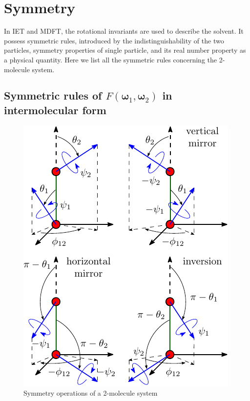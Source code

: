 \section{Symmetry\label{sec:Symmetry-rot_invar}}

In \acs{IET} and \acs{MDFT}, the rotational invariants are used
to describe the solvent. It possess symmetric rules, introduced by
the indistinguishability of the two particles, symmetry properties
of single particle, and its real number property as a physical quantity.
Here we list all the symmetric rules concerning the 2-molecule system.

\subsection{Symmetric rules of $F(\boldsymbol{\omega}_{1},\boldsymbol{\omega}_{2})$
in intermolecular form\label{subsec:Symmetric-dcf}}

\begin{figure}[h]
\begin{centering}
\includegraphics{_figure/symmetry_dcf}
\par\end{centering}
\caption{Symmetry operations of a 2-molecule system\label{fig:Symmetry-operations}}
\end{figure}

